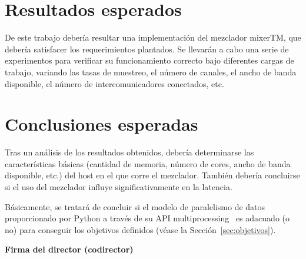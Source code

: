 \documentclass[titlepage, 12pt, a4paper, oneside]{article}
\begin{document}
\section{Resultados esperados}
\label{sec:resultados}
De este trabajo debería resultar una implementación del mezclador
mixerTM, que debería satisfacer los requerimientos plantados. Se
llevarán a cabo una serie de experimentos para verificar su
funcionamiento correcto bajo diferentes cargas de trabajo, variando
las tasas de muestreo, el número de canales, el ancho de banda
disponible, el número de intercomunicadores conectados, etc.

\section{Conclusiones esperadas}
\label{sec:conclusiones}
Tras un análisis de los resultados obtenidos, debería determinarse las
características básicas (cantidad de memoria, número de cores, ancho
de banda disponible, etc.) del host en el que corre el
mezclador. También debería concluirse si el uso del mezclador influye
significativamente en la latencia.

Básicamente, se tratará de concluir si el modelo de paralelismo de
datos proporcionado por Python a través de su API
multiprocessing~\cite{multiprocessing} es adacuado (o no) para
conseguir los objetivos definidos (véase la
Sección~\ref{sec:objetivos}).




\begin{center}
  \textbf{Firma del director (codirector)}
\end{center}
\end{document}
